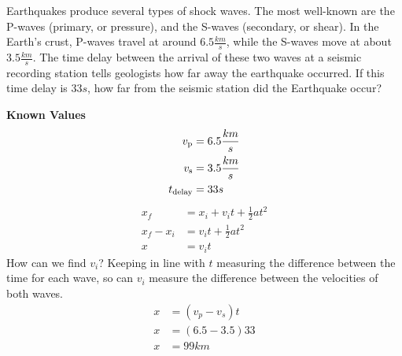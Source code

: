 \documentclass[12pt]{article}
\begin{document}
\begin{example}
  Earthquakes produce several types of shock waves. The most well-known are the P-waves 
  (primary, or pressure), and the S-waves (secondary, or shear). In the Earth’s crust, 
  P-waves travel at around $6.5 \frac{km}{s}$, while the S-waves move at about $3.5 \frac{km}{s}$. The time
  delay between the arrival of these two waves at a seismic recording station tells 
  geologists how far away the earthquake occurred. If this time delay is $33 s$, how far
  from the seismic station did the Earthquake occur?

  \begin{tcolorbox}[
    standard jigsaw, %
    colframe=fg,
    boxrule=0px,
    opacityback=0,
    sidebyside,
    lefthand width=75px,
    coltext=fg,
  ]
  \textbf{Known Values}
  \begin{align*}
    v_{\textup{p}}     &= 6.5 \frac{km}{s} \\
    v_{\textup{s}}     &= 3.5 \frac{km}{s} \\
    t_{\textup{delay}} &= 33 s
  \end{align*}
  \tcblower
  \begin{align*}
    x_f       &= x_i + v_it + \frac{1}{2}at^2 \\
    x_f - x_i &= v_it + \frac{1}{2}at^2 \\ 
    x         &= v_it
  \end{align*}
  How can we find $v_i$? Keeping in line with $t$ measuring the difference between the time for each wave, so can $v_i$ measure the difference between the velocities of both waves.
  \begin{align*}
    x &= (v_p-v_s)t  \\
    x &= (6.5-3.5)33 \\
    x &= 99km
  \end{align*}
  \end{tcolorbox}
\end{example}
\end{document}
